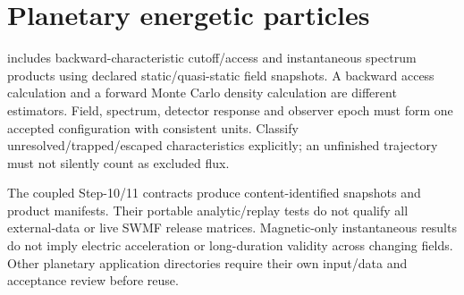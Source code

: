 \section{Planetary energetic particles}
 includes backward-characteristic cutoff/access and
instantaneous spectrum products using declared static/quasi-static field
snapshots. A backward access calculation and a forward Monte Carlo density
calculation are different estimators. Field, spectrum, detector response and
observer epoch must form one accepted configuration with consistent units.
Classify unresolved/trapped/escaped characteristics explicitly; an unfinished
trajectory must not silently count as excluded flux.

The coupled Step-10/11 contracts produce content-identified snapshots and
product manifests. Their portable analytic/replay tests do not qualify
all external-data or live SWMF release matrices. Magnetic-only instantaneous
results do not imply electric acceleration or long-duration validity across
changing fields. Other planetary application directories require their own
input/data and acceptance review before reuse.
